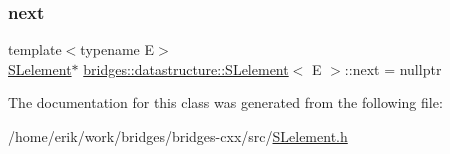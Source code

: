 \subsubsection{\texorpdfstring{next}{next}}
{\footnotesize\ttfamily template$<$typename E$>$ \\
\hyperlink{classbridges_1_1datastructure_1_1_s_lelement}{S\+Lelement}$\ast$ \hyperlink{classbridges_1_1datastructure_1_1_s_lelement}{bridges\+::datastructure\+::\+S\+Lelement}$<$ E $>$\+::next = nullptr\hspace{0.3cm}{\ttfamily [protected]}}



The documentation for this class was generated from the following file\+:\begin{DoxyCompactItemize}
\item 
/home/erik/work/bridges/bridges-\/cxx/src/\hyperlink{_s_lelement_8h}{S\+Lelement.\+h}\end{DoxyCompactItemize}
